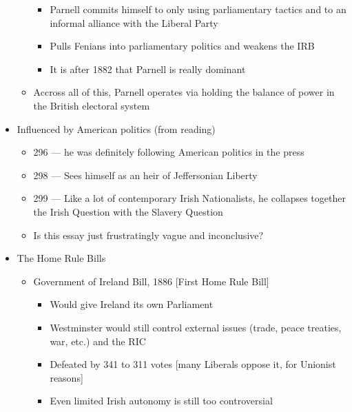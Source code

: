 \documentclass[12pt]{article}
\begin{document}
\begin{itemize}
\begin{itemize}
\begin{itemize}
                        \item Parnell commits himself to only using parliamentary tactics and to an informal alliance with the Liberal Party
                        \item Pulls Fenians into parliamentary politics and weakens the IRB
                        \item It is after 1882 that Parnell is really dominant
                    \end{itemize}
                    \item Accross all of this, Parnell operates via holding the balance of power in the British electoral system
                \end{itemize}
                \item Influenced by American politics (from reading)
                \begin{itemize}
                    \item 296 --- he was definitely following American politics in the press
                    \item 298 --- Sees himself as an heir of Jeffersonian Liberty
                    \item 299 --- Like a lot of contemporary Irish Nationalists, he collapses together the Irish Question with the Slavery Question
                    \item Is this essay just frustratingly vague and inconclusive? 
                \end{itemize}
                \item The Home Rule Bills
                \begin{itemize}
                    \item Government of Ireland Bill, 1886 [First Home Rule Bill]
                    \begin{itemize}
                        \item Would give Ireland its own Parliament
                        \item Westminster would still control external issues (trade, peace treaties, war, etc.) and the RIC
                        \item Defeated by 341 to 311 votes [many Liberals oppose it, for Unionist reasons]
                        \item Even limited Irish autonomy is still too controversial
                    \end{itemize}
                \end{itemize}

\end{itemize}
\end{document}
